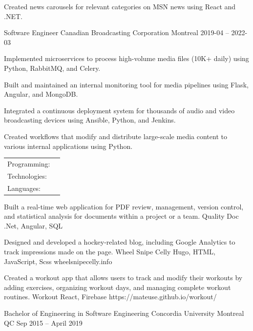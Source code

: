 \documentclass[]{awesome-cv}
\begin{document}
\begin{cventries}
{\begin{cvitems}
		\item {Created news carousels for relevant categories on MSN news using React and .NET.}
	\end{cvitems}}
	\vspace{3mm}
	\cventry
	{Software Engineer}
	{Canadian Broadcasting Corporation}
	{Montreal}
	{2019-04 – 2022-03}
	{\begin{cvitems}
		\item {Implemented microservices to process high-volume media files (10K+ daily) using Python, RabbitMQ, and Celery.}
		\item {Built and maintained an internal monitoring tool for media pipelines using Flask, Angular, and MongoDB.}
		\item {Integrated a continuous deployment system for thousands of audio and video broadcasting devices using Ansible, Python, and Jenkins.}
		\item {Created workflows that modify and distribute large-scale media content to various internal applications using Python.}
	\end{cvitems}}
\end{cventries}
\begin{cventries}
	\cventry
	{}
	{\def\arraystretch{1.15}{\begin{tabular}{ l l }
		Programming:  & {\skill{ Python, .NET, React, Angular, Node, Java, Golang, HTML, CSS}} \\
		Technologies:  & {\skill{ Ansible, Jenkins, MongoDB, SQL, Rabbit MQ, Celery, AWS, Kusto}} \\
		Languages:  & {\skill{ English (Mother Tongue), French (Fluent), Portuguese}} \\
		\end{tabular}}}
	{}
	{}
	{}
\end{cventries}

\vspace{-7mm}
\begin{cventries}
	\cventry
	{Built a real-time web application for PDF review, management, version control, and statistical analysis for documents within a project or a team.}
	{Quality Doc}
	{.Net, Angular, SQL}
	{}
	{}
	
	\vspace{-5mm}
	\cventry
	{Designed and developed a hockey-related blog, including Google Analytics to track impressions made on the page.}
	{Wheel Snipe Celly}
	{Hugo, HTML, JavaScript, Scss}
	{wheelsnipecelly.info}
	{}
	
	\vspace{-5mm}
	\cventry
	{Created a workout app that allows users to track and modify their workouts by adding exercises, organizing workout days, and managing complete workout routines.}
	{Workout}
	{React, Firebase}
	{https://mateuse.github.io/workout/}
	{}
	
	\vspace{-5mm}
\end{cventries}

\begin{cventries}
	\cventry
	{Bachelor of Engineering in Software Engineering}
	{Concordia University}
	{Montreal QC}
	{Sep 2015 – April 2019}
	{}
\end{cventries}

\vspace{-2mm}
\ 
\end{document}

